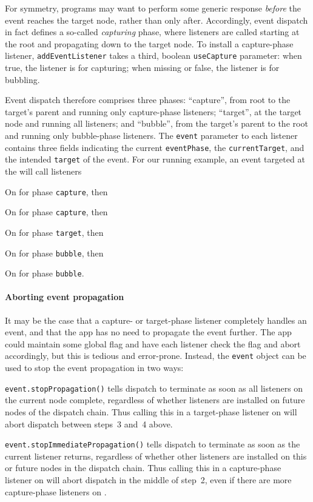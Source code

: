 \documentclass[letterpaper,10pt,twocolumn]{article}
\newcommand{\quot}{\mbox{\tt\char'042}}
\newcommand{\wild}{\mbox{\tt\char'137}}
\newcommand{\impl}[1]{{\def\_{\wild}\def\"{\quot}\tt#1}}
\begin{document}
For symmetry, programs may want to perform some generic response
\emph{before} the event reaches the target node, rather than only
after.  Accordingly, event dispatch in fact defines a so-called
\emph{capturing} phase, where listeners are called starting at the
root and propagating down to the target node.  To install a
capture-phase listener, \impl{addEventListener} takes a third, boolean
\impl{useCapture} parameter: when true, the listener is for capturing;
when missing or false, the listener is for bubbling.

Event dispatch therefore comprises three phases: ``capture'', from
root to the target's parent and running only capture-phase listeners;
``target'', at the target node and running all listeners; and
``bubble'', from the target's parent to the root and running only
bubble-phase listeners.  The \impl{event} parameter to each listener
contains three fields indicating the current \impl{eventPhase}, the
\impl{currentTarget}, and the intended \impl{target} of the event.
For our running example, an event targeted at the  will
call listeners
\begin{compactenum}
\item On  for phase \impl{capture}, then
\item On  for phase \impl{capture}, then
\item On  for phase \impl{target}, then
\item On  for phase \impl{bubble}, then
\item On  for phase \impl{bubble}.
\end{compactenum}
\paragraph{Aborting event propagation}
It may be the case that a capture- or target-phase listener completely
handles an event, and that the app has no need to propagate the event
further.  The app could maintain some global flag and have each
listener check the flag and abort accordingly, but this is tedious and
error-prone.  Instead, the \impl{event} object can be used to stop the
event propagation in two ways:
\begin{compactitem}
\item \impl{event.stopPropagation()} tells dispatch to terminate as
  soon as all listeners on the current node complete, regardless of
  whether listeners are installed on future nodes of the dispatch
  chain.  Thus calling this in a target-phase listener on 
  will abort dispatch between steps~3 and~4 above.
\item \impl{event.stopImmediatePropagation()} tells dispatch to
  terminate as soon as the current listener returns, regardless of
  whether other listeners are installed on this or future nodes in the
  dispatch chain.  Thus calling this in a capture-phase listener on
   will abort dispatch in the middle of step~2, even if there
  are more capture-phase listeners on .
\end{compactitem}
\end{document}
